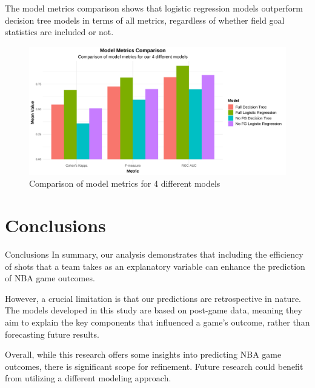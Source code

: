 \documentclass[
  ignorenonframetext,
]{beamer}
\begin{document}
\begin{frame}
The model metrics comparison shows that logistic regression models
outperform decision tree models in terms of all metrics, regardless of
whether field goal statistics are included or not.

\begin{figure}

{\centering \includegraphics[width=1\linewidth]{latex/plotspres/plot_12} 

}

\caption{Comparison of model metrics for 4 different models}\label{fig:metricsplot}
\end{figure}
\end{frame}

\hypertarget{conclusions}{%
\section{Conclusions}\label{conclusions}}

\begin{frame}{Conclusions}
In summary, our analysis demonstrates that including the efficiency of
shots that a team takes as an explanatory variable can enhance the
prediction of NBA game outcomes.

However, a crucial limitation is that our predictions are retrospective
in nature. The models developed in this study are based on post-game
data, meaning they aim to explain the key components that influenced a
game's outcome, rather than forecasting future results.

Overall, while this research offers some insights into predicting NBA
game outcomes, there is significant scope for refinement. Future
research could benefit from utilizing a different modeling approach.
\end{frame}
\end{document}

